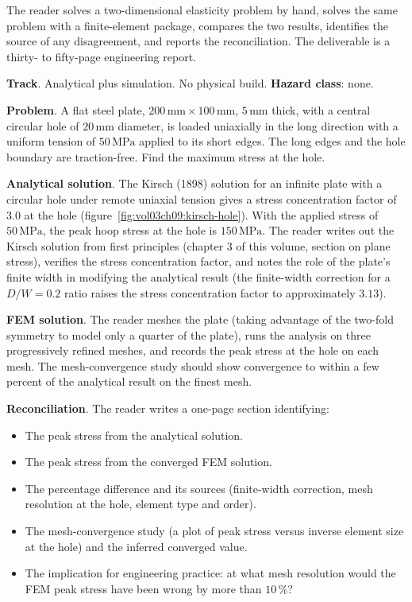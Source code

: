 \begin{project}
The reader solves a two-dimensional elasticity problem by hand,
solves the same problem with a finite-element package, compares
the two results, identifies the source of any disagreement, and
reports the reconciliation. The deliverable is a thirty- to
fifty-page engineering report.

\textbf{Track}. Analytical plus simulation. No physical build.
\textbf{Hazard class}: none.

\textbf{Problem}. A flat steel plate, $200\,\si{\milli\meter}
\times 100 \,\si{\milli\meter}$, $5\,\si{\milli\meter}$ thick, with
a central circular hole of $20\,\si{\milli\meter}$ diameter, is
loaded uniaxially in the long direction with a uniform tension of
$50\,\text{MPa}$ applied to its short edges. The long edges and
the hole boundary are traction-free. Find the maximum stress at
the hole.



\textbf{Analytical solution}. The Kirsch (1898) solution for an
infinite plate with a circular hole under remote uniaxial tension
gives a stress concentration factor of $3.0$ at the hole
(figure~\ref{fig:vol03ch09:kirsch-hole}). With the
applied stress of $50\,\text{MPa}$, the peak hoop stress at the
hole is $150\,\text{MPa}$. The reader writes out the Kirsch
solution from first principles (chapter 3 of this volume, section
on plane stress), verifies the stress concentration factor, and
notes the role of the plate's finite width in modifying the
analytical result (the finite-width correction for a $D/W = 0.2$
ratio raises the stress concentration factor to approximately
$3.13$).

\textbf{FEM solution}. The reader meshes the plate (taking
advantage of the two-fold symmetry to model only a quarter of the
plate), runs the analysis on three progressively refined meshes,
and records the peak stress at the hole on each mesh. The
mesh-convergence study should show convergence to within a few
percent of the analytical result on the finest mesh.

\textbf{Reconciliation}. The reader writes a one-page section
identifying:

\begin{itemize}[leftmargin=*]
  \item The peak stress from the analytical solution.
  \item The peak stress from the converged FEM solution.
  \item The percentage difference and its sources (finite-width
    correction, mesh resolution at the hole, element type and
    order).
  \item The mesh-convergence study (a plot of peak stress versus
    inverse element size at the hole) and the inferred converged
    value.
  \item The implication for engineering practice: at what mesh
    resolution would the FEM peak stress have been wrong by more
    than $10\,\%$?
\end{itemize}


\end{project}
